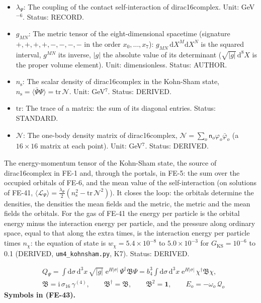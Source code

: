 \documentclass[
  10pt,
]{article}
\begin{document}
\begin{itemize}
  for \(SU(2)\) with \(g_2\epsilon^{IJK}\)). Unit: 1/length. Status:
  STANDARD.
\item
  \(\lambda_\Psi\): The coupling of the contact self-interaction of
  dirac16complex. Unit: GeV\(^{-6}\). Status: RECORD.
\item
  \(g_{MN}\): The metric tensor of the eight-dimensional spacetime
  (signature \(+,+,+,+,-,-,-,-\) in the order \(x_0, \dots, x_7\)):
  \(g_{MN}\,\mathrm{d}X^M\mathrm{d}X^N\) is the squared interval,
  \(g^{MN}\) its inverse, \(\lvert g\rvert\) the absolute value of its
  determinant (\(\sqrt{\lvert g\rvert}\,\mathrm{d}^8X\) is the proper
  volume element). Unit: dimensionless. Status: AUTHOR.
\item
  \(n_{\mathrm{s}}\): The scalar density of dirac16complex in the
  Kohn-Sham state,
  \(n_{\mathrm{s}} = \langle\bar\Psi\Psi\rangle = \mathrm{tr}\,\mathcal{N}\).
  Unit: GeV\(^7\). Status: DERIVED.
\item
  \(\mathrm{tr}\): The trace of a matrix: the sum of its diagonal
  entries. Status: STANDARD.
\item
  \(\mathcal{N}\): The one-body density matrix of dirac16complex,
  \(\mathcal{N} = \sum_o\mathsf{n}_o\varphi_o\bar\varphi_o\) (a
  \(16 \times 16\) matrix at each point). Unit: GeV\(^7\). Status:
  DERIVED.
\end{itemize}

The energy-momentum tensor of the Kohn-Sham state, the source of
dirac16complex in FE-1 and, through the portals, in FE-5: the sum over
the occupied orbitals of FE-6, and the mean value of the
self-interaction (on solutions of FE-41,
\(\langle\mathcal{L}_\Psi\rangle = \frac{\lambda_\Psi}{2}(n_{\mathrm{s}}^2 - \mathrm{tr}\,\mathcal{N}^2)\)).
It closes the loop: the orbitals determine the densities, the densities
the mean fields and the metric, the metric and the mean fields the
orbitals. For the gas of FE-41 the energy per particle is the orbital
energy minus the interaction energy per particle, and the pressure along
ordinary space, equal to that along the extra times, is the interaction
energy per particle times \(n_\chi\): the equation of state is
\(w_\chi = 5.4\times10^{-8}\) to \(5.0\times10^{-3}\) for
\(G_{\mathrm{KS}} = 10^{-6}\) to 0.1 (DERIVED,
\texttt{um4\_kohnsham.py}, K7). Status: DERIVED.

\[
\begin{aligned}
&Q_\Psi = \int\mathrm{d}\sigma\,\mathrm{d}^3x\,\sqrt{\lvert g\rvert}\;\mathrm{e}^{H\lvert\sigma\rvert}\,\Psi^\dagger\mathfrak{B}\Psi
 = b_4^3\int\mathrm{d}\sigma\,\mathrm{d}^3x\;\mathrm{e}^{H\lvert\sigma\rvert}\,\chi^\dagger\mathfrak{B}\chi,\\
&\mathfrak{B} = \mathrm{i}\,\sigma_{16}\,\gamma^{(4)},\qquad \mathfrak{B}^\dagger = \mathfrak{B},\qquad \mathfrak{B}^2 = \mathbf{1},\qquad
E_o = -\omega_o\,\mathcal{Q}_o
\end{aligned} \tag{FE-43}
\] \textbf{Symbols in (FE-43).}
\end{document}
